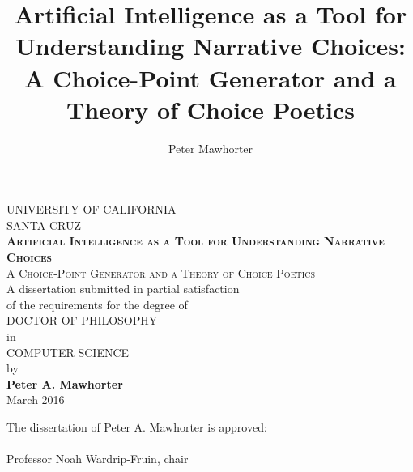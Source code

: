 
\title{Artificial Intelligence as a Tool for Understanding Narrative Choices: A Choice-Point Generator and a Theory of Choice Poetics}
\author{Peter Mawhorter}

\begin{titlepage}
\begin{center}
\vspace{2.5\baselineskip}
UNIVERSITY OF CALIFORNIA \\
SANTA CRUZ \\
\vspace{\baselineskip}
\textsc{\textbf{Artificial Intelligence as a Tool for Understanding Narrative Choices}} \\
\textsc{A Choice-Point Generator and a Theory of Choice Poetics} \\
\vspace{\baselineskip}
A dissertation submitted in partial satisfaction \\
of the requirements for the degree of \\
\vspace{\baselineskip}
DOCTOR OF PHILOSOPHY \\
\vspace{\baselineskip}
in \\
\vspace{\baselineskip}
COMPUTER SCIENCE \\
\vspace{\baselineskip}
by \\
\vspace{\baselineskip}
\textbf{Peter A. Mawhorter} \\
\vspace{\baselineskip}
March 2016 \\
\vspace{2.5\baselineskip}
\end{center}
\raggedleft
\parbox{15em}{
The dissertation of Peter A. Mawhorter is approved: \\
\vspace{2.5\baselineskip}
\underline{\hspace{15em}} \\
Professor Noah Wardrip-Fruin, chair \\
\vspace{2.5\baselineskip}
\underline{\hspace{15em}} \\
}
\end{titlepage}
